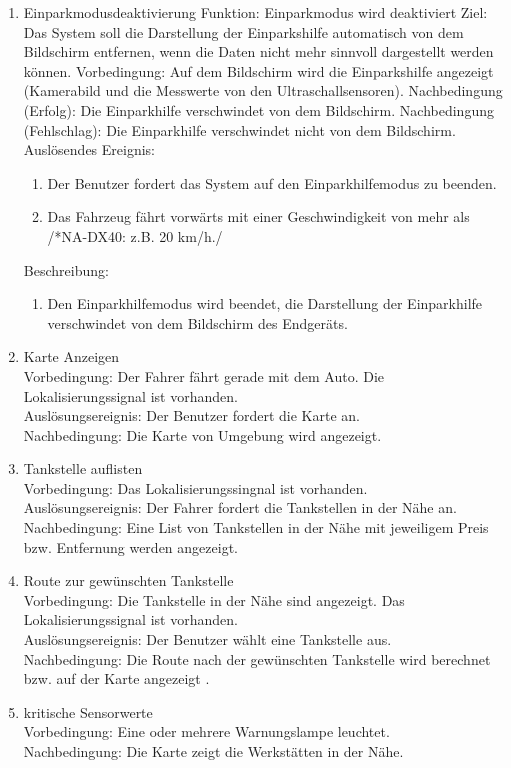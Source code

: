 \documentclass[pflichtenheft.tex]{subfiles}
\begin{document}
\begin{enumerate}
	\item{Einparkmodusdeaktivierung}
	Funktion: Einparkmodus wird deaktiviert
	Ziel: Das System soll die Darstellung der Einparkshilfe automatisch von dem Bildschirm entfernen, wenn die Daten nicht mehr sinnvoll dargestellt werden können.
	Vorbedingung: Auf dem Bildschirm wird die Einparkshilfe angezeigt (Kamerabild und die Messwerte von den Ultraschallsensoren).
	Nachbedingung (Erfolg): Die Einparkhilfe verschwindet von dem Bildschirm.
	Nachbedingung (Fehlschlag): Die Einparkhilfe verschwindet nicht von dem Bildschirm.
	Auslösendes Ereignis:
		\begin{enumerate}
			\item Der Benutzer fordert das System auf den Einparkhilfemodus zu beenden.
			\item Das Fahrzeug fährt vorwärts mit einer Geschwindigkeit von mehr als /*NA-DX40: z.B. 20 km/h./
		\end{enumerate}
	Beschreibung:
		\begin{enumerate}
			\item Den Einparkhilfemodus wird beendet, die Darstellung der Einparkhilfe verschwindet von dem Bildschirm des Endgeräts.
		\end{enumerate}

		  \item{Karte Anzeigen}
  \\Vorbedingung: Der Fahrer fährt gerade mit dem Auto. Die Lokalisierungssignal ist vorhanden.
  \\Auslösungsereignis: Der Benutzer fordert die Karte an.
  \\Nachbedingung: Die Karte von Umgebung wird angezeigt.
  
  \item {Tankstelle auflisten}
  \\Vorbedingung: Das Lokalisierungssingnal ist vorhanden.
  \\Auslösungsereignis: Der Fahrer fordert die Tankstellen in der Nähe an.
  \\Nachbedingung: Eine List von Tankstellen in der Nähe mit jeweiligem Preis
  bzw. Entfernung werden angezeigt.
  
  \item {Route zur gewünschten Tankstelle}
  \\Vorbedingung: Die Tankstelle in der Nähe sind angezeigt. Das
  Lokalisierungssignal ist vorhanden.
  \\Auslösungsereignis: Der Benutzer wählt eine Tankstelle aus.
  \\Nachbedingung: Die Route nach der gewünschten Tankstelle wird berechnet
  bzw. auf der Karte angezeigt .
  
  \item{kritische Sensorwerte} 
  \\Vorbedingung: Eine oder mehrere Warnungslampe leuchtet.
  \\Nachbedingung: Die Karte zeigt die Werkstätten in der Nähe.

\end{enumerate}
\end{document}
